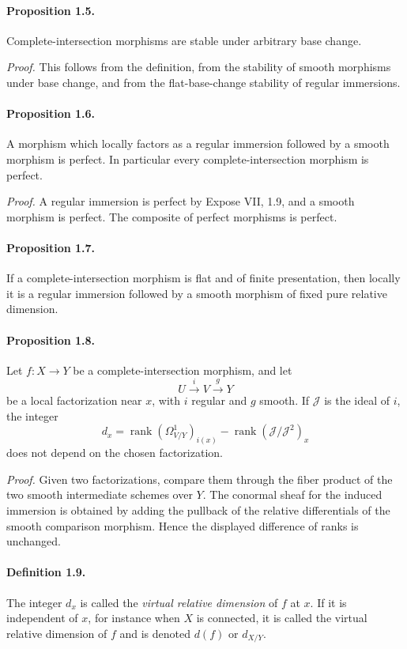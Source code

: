 \documentclass[11pt]{article}
\theoremstyle{plain}
\theoremstyle{definition}
\theoremstyle{remark}
\newcommand{\cJ}{\mathcal J}\newcommand{\cK}{\mathcal K}\newcommand{\cL}{\mathcal L}
\DeclareMathOperator{\rank}{rank}
\providecommand{\xto}[1]{\xrightarrow{#1}}
\begin{document}
\paragraph{Proposition 1.5.} Complete-intersection morphisms are stable under arbitrary base change.

\emph{Proof.} This follows from the definition, from the stability of smooth morphisms under base change, and from the flat-base-change stability of regular immersions.

\paragraph{Proposition 1.6.} A morphism which locally factors as a regular immersion followed by a smooth morphism is perfect. In particular every complete-intersection morphism is perfect.

\emph{Proof.} A regular immersion is perfect by Expose VII, 1.9, and a smooth morphism is perfect. The composite of perfect morphisms is perfect.

\paragraph{Proposition 1.7.} If a complete-intersection morphism is flat and of finite presentation, then locally it is a regular immersion followed by a smooth morphism of fixed pure relative dimension.

\paragraph{Proposition 1.8.} Let $f:X\to Y$ be a complete-intersection morphism, and let
\[
U\xto{i}V\xto{g}Y
\]
be a local factorization near $x$, with $i$ regular and $g$ smooth. If $\cJ$ is the ideal of $i$, the integer
\[
d_x=\rank(\Omega^1_{V/Y})_{i(x)}-\rank(\cJ/\cJ^2)_x
\]
does not depend on the chosen factorization.

\emph{Proof.} Given two factorizations, compare them through the fiber product of the two smooth intermediate schemes over $Y$. The conormal sheaf for the induced immersion is obtained by adding the pullback of the relative differentials of the smooth comparison morphism. Hence the displayed difference of ranks is unchanged.

\paragraph{Definition 1.9.} The integer $d_x$ is called the \emph{virtual relative dimension} of $f$ at $x$. If it is independent of $x$, for instance when $X$ is connected, it is called the virtual relative dimension of $f$ and is denoted $d(f)$ or $d_{X/Y}$.
\end{document}

